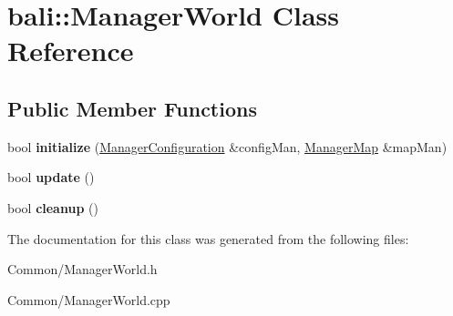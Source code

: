 \hypertarget{classbali_1_1_manager_world}{\section{bali\-:\-:Manager\-World Class Reference}
\label{classbali_1_1_manager_world}
}
\subsection*{Public Member Functions}
\begin{DoxyCompactItemize}
\item 
\hypertarget{classbali_1_1_manager_world_ae8d607f785bf9a1aa6d1f26639444358}{bool {\bfseries initialize} (\hyperlink{classbali_1_1_manager_configuration}{Manager\-Configuration} \&config\-Man, \hyperlink{classbali_1_1_manager_map}{Manager\-Map} \&map\-Man)}\label{classbali_1_1_manager_world_ae8d607f785bf9a1aa6d1f26639444358}

\item 
\hypertarget{classbali_1_1_manager_world_a1466157041c7855a4ba20c403f29e6c7}{bool {\bfseries update} ()}\label{classbali_1_1_manager_world_a1466157041c7855a4ba20c403f29e6c7}

\item 
\hypertarget{classbali_1_1_manager_world_ad550138b2c76119bbf4670ac8cff1039}{bool {\bfseries cleanup} ()}\label{classbali_1_1_manager_world_ad550138b2c76119bbf4670ac8cff1039}

\end{DoxyCompactItemize}


The documentation for this class was generated from the following files\-:\begin{DoxyCompactItemize}
\item 
Common/Manager\-World.\-h\item 
Common/Manager\-World.\-cpp\end{DoxyCompactItemize}
